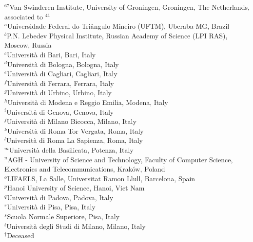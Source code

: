 \documentclass[12pt,a4paper]{article}
\begin{document}
\begin{flushleft}
{$ ^{67}$Van Swinderen Institute, University of Groningen, Groningen, The Netherlands, associated to $^{41}$\\
\bigskip
$ ^{a}$Universidade Federal do Tri\^{a}ngulo Mineiro (UFTM), Uberaba-MG, Brazil\\
$ ^{b}$P.N. Lebedev Physical Institute, Russian Academy of Science (LPI RAS), Moscow, Russia\\
$ ^{c}$Universit\`{a} di Bari, Bari, Italy\\
$ ^{d}$Universit\`{a} di Bologna, Bologna, Italy\\
$ ^{e}$Universit\`{a} di Cagliari, Cagliari, Italy\\
$ ^{f}$Universit\`{a} di Ferrara, Ferrara, Italy\\
$ ^{g}$Universit\`{a} di Urbino, Urbino, Italy\\
$ ^{h}$Universit\`{a} di Modena e Reggio Emilia, Modena, Italy\\
$ ^{i}$Universit\`{a} di Genova, Genova, Italy\\
$ ^{j}$Universit\`{a} di Milano Bicocca, Milano, Italy\\
$ ^{k}$Universit\`{a} di Roma Tor Vergata, Roma, Italy\\
$ ^{l}$Universit\`{a} di Roma La Sapienza, Roma, Italy\\
$ ^{m}$Universit\`{a} della Basilicata, Potenza, Italy\\
$ ^{n}$AGH - University of Science and Technology, Faculty of Computer Science, Electronics and Telecommunications, Krak\'{o}w, Poland\\
$ ^{o}$LIFAELS, La Salle, Universitat Ramon Llull, Barcelona, Spain\\
$ ^{p}$Hanoi University of Science, Hanoi, Viet Nam\\
$ ^{q}$Universit\`{a} di Padova, Padova, Italy\\
$ ^{r}$Universit\`{a} di Pisa, Pisa, Italy\\
$ ^{s}$Scuola Normale Superiore, Pisa, Italy\\
$ ^{t}$Universit\`{a} degli Studi di Milano, Milano, Italy\\
\medskip
$ ^{\dagger}$Deceased
}
\end{flushleft}
 \newpage
\end{document}
